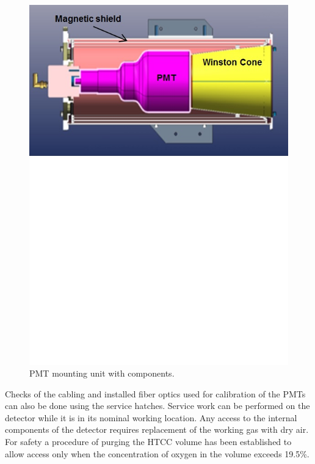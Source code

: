 \begin{figure}[ht]
    \centering
    \includegraphics[width=1.0\linewidth,trim={0 12cm 0 0},clip]{images/PMT_Mount.jpg}
    \caption{PMT mounting unit with components.}
    \label{fig:PMT_Mount}
\end{figure}

Checks of the cabling and installed fiber optics used for calibration of the PMTs can also be done using the
service hatches. Service work can be performed on the detector while it is in its nominal working location. Any
access to the internal components of the detector requires replacement of the working gas with dry air. For
safety a procedure of purging the HTCC volume has been established to allow access only when the concentration
of oxygen in the volume exceeds 19.5\%.

